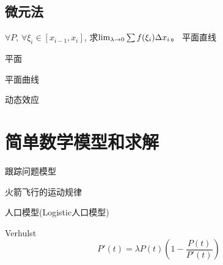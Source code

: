 \subsection{微元法}
$\forall P$, $\forall \xi_i \in [x_{i-1}, x_i]$, 求$\lim_{\lambda \to 0 } \sum f(\xi_i)\Delta x_i$。
平面直线

平面
\begin{example}[静态分布求总量]
    
\end{example}
\begin{solution}
    
\end{solution}

平面曲线

动态效应

\section{简单数学模型和求解}
跟踪问题模型

火箭飞行的运动规律

人口模型(Logistic人口模型)

Verhulst
\begin{equation*}
    P'(t) = \lambda P(t)\left(1-\frac{P(t)}{P'(t)}\right)
\end{equation*}
